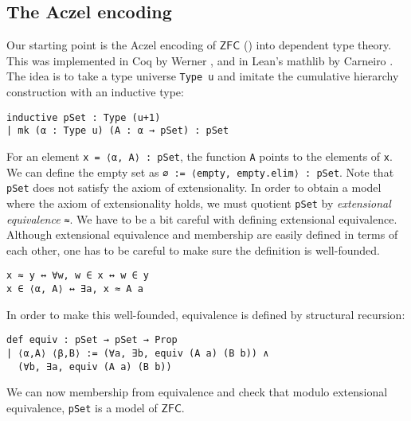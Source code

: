 \documentclass[sigplan,10pt,review, autoref,anonymous]{acmart}
\newcommand{\lil}{\lstinline}
\theoremstyle{definition}
\begin{document}
\subsection{The Aczel encoding}
\label{subsection:bset:aczel}
Our starting point is the Aczel encoding of \(\mathsf{ZFC}\) (\cite{aczel1978type, aczel1986type, aczel1982type}) into dependent type theory.
This was implemented in Coq by Werner \cite{werner1997sets}, and in Lean's \textsf{mathlib} by Carneiro \cite{mario1}.
The idea is to take a type universe \lstinline{Type u} and imitate the cumulative hierarchy construction with an inductive type:
\begin{lstlisting}
inductive pSet : Type (u+1)
| mk (α : Type u) (A : α → pSet) : pSet
\end{lstlisting}
For an element \lil{x = ⟨α, A⟩ : pSet}, the function \lil{A} points to the elements of \lil{x}.
We can define the empty set as \lstinline{∅ := ⟨empty, empty.elim⟩ : pSet}.
Note that \lil{pSet} does not satisfy the axiom of extensionality.
In order to obtain a model where the axiom of extensionality holds, we must quotient \lstinline{pSet} by \emph{extensional equivalence} \lil{≈}.
We have to be a bit careful with defining extensional equivalence.
Although extensional equivalence and membership are easily defined in terms of each other,
one has to be careful to make sure the definition is well-founded.
\begin{lstlisting}
x ≈ y ↔ ∀w, w ∈ x ↔ w ∈ y
x ∈ ⟨α, A⟩ ↔ ∃a, x ≈ A a
\end{lstlisting}
In order to make this well-founded, equivalence is defined by structural recursion:
\begin{lstlisting}
def equiv : pSet → pSet → Prop
| ⟨α,A⟩ ⟨β,B⟩ := (∀a, ∃b, equiv (A a) (B b)) ∧
  (∀b, ∃a, equiv (A a) (B b))
\end{lstlisting}

We can now membership from equivalence and check that modulo extensional equivalence, \lstinline{pSet} is a model of \(\mathsf{ZFC}\).

\end{document}
